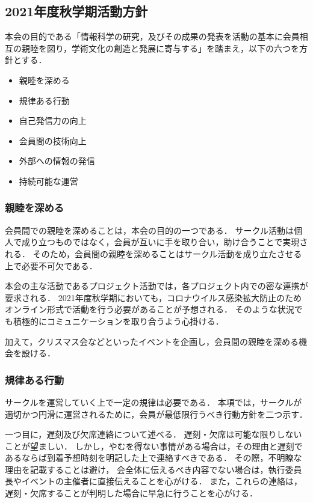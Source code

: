 \subsection*{2021年度秋学期活動方針}


本会の目的である「情報科学の研究，及びその成果の発表を活動の基本に会員相互の親睦を図り，学術文化の創造と発展に寄与する」を踏まえ，以下の六つを方針とする．

\begin{itemize}
    \item 親睦を深める
    \item 規律ある行動
    \item 自己発信力の向上
    \item 会員間の技術向上
    \item 外部への情報の発信
    \item 持続可能な運営
\end{itemize}

\subsubsection*{親睦を深める}
    会員間での親睦を深めることは，本会の目的の一つである．
    サークル活動は個人で成り立つものではなく，会員が互いに手を取り合い，助け合うことで実現される．
    そのため，会員間の親睦を深めることはサークル活動を成り立たさせる上で必要不可欠である．

    本会の主な活動であるプロジェクト活動では，各プロジェクト内での密な連携が要求される．
    2021年度秋学期においても，コロナウイルス感染拡大防止のためオンライン形式で活動を行う必要があることが予想される．
    そのような状況でも積極的にコミュニケーションを取り合うよう心掛ける．

    加えて，クリスマス会などといったイベントを企画し，会員間の親睦を深める機会を設ける．

\subsubsection*{規律ある行動}
    サークルを運営していく上で一定の規律は必要である．
    本項では，サークルが適切かつ円滑に運営されるために，会員が最低限行うべき行動方針を二つ示す．

    一つ目に，遅刻及び欠席連絡について述べる．
    遅刻・欠席は可能な限りしないことが望ましい．
    しかし，やむを得ない事情がある場合は，その理由と遅刻であるならば到着予想時刻を明記した上で連絡すべきである．
    その際，不明瞭な理由を記載することは避け，
    会全体に伝えるべき内容でない場合は，執行委員長やイベントの主催者に直接伝えることを心がける．
    また，これらの連絡は，遅刻・欠席することが判明した場合に早急に行うことを心がける．

